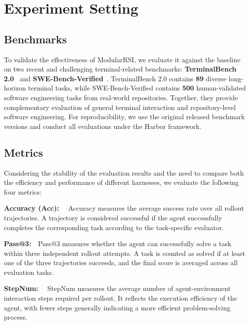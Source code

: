 \documentclass{article} %
\begin{document}
\section{Experiment Setting}
\label{sec:exp_settings}




\subsection{Benchmarks}
To validate the effectiveness of ModularRSI, we evaluate it against the baseline on two recent and challenging terminal-related benchmarks: \textbf{TerminalBench 2.0}~\citep{merrill2026terminalbenchbenchmarkingagentshard} and \textbf{SWE-Bench-Verified}~\citep{jimenez2024swe}. TerminalBench 2.0 contains \textbf{89} diverse long-horizon terminal tasks, while SWE-Bench-Verified contains \textbf{500} human-validated software engineering tasks from real-world repositories. Together, they provide complementary evaluation of general terminal interaction and repository-level software engineering. For reproducibility, we use the original released benchmark versions and conduct all evaluations under the Harbor framework.




\subsection{Metrics}
Considering the stability of the evaluation results and the need to compare both the efficiency and performance of different harnesses, we evaluate the following four metrics:

\noindent\textbf{Accuracy (Acc):}~~
Accuracy measures the average success rate over all rollout trajectories. A trajectory is considered successful if the agent successfully completes the corresponding task according to the task-specific evaluator.

\noindent\textbf{Pass@3:}~~Pass@3 measures whether the agent can successfully solve a task within three independent rollout attempts. A task is counted as solved if at least one of the three trajectories succeeds, and the final score is averaged across all evaluation tasks.

\noindent\textbf{StepNum:}~~
StepNum measures the average number of agent-environment interaction steps required per rollout. It reflects the execution efficiency of the agent, with fewer steps generally indicating a more efficient problem-solving process.
\end{document}
